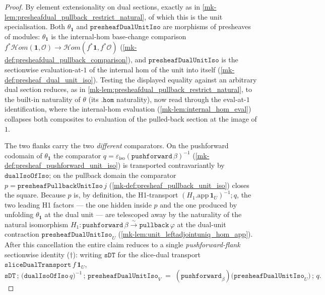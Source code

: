 \begin{proof}
  \leanok
  By element extensionality on dual sections, exactly as in
  \ref{mk-lem:presheafdual_pullback_restrict_natural}, of which this is the unit specialisation. Both
  \(\theta_{\mathbf 1}\) and \(\mathtt{presheafDualUnitIso}\) are morphisms of presheaves of modules:
  \(\theta_{\mathbf 1}\) is the internal-hom base-change comparison
  \(f^{*}\mathcal{H}om(\mathbf 1, \mathcal{O}) \to \mathcal{H}om(f^{*}\mathbf 1, f^{*}\mathcal{O})\)
  (\ref{mk-def:presheafdual_pullback_comparison}), and \(\mathtt{presheafDualUnitIso}\) is the
  sectionwise evaluation-at-\(1\) of the internal hom of the unit into itself
  (\ref{mk-def:presheaf_dual_unit_iso}). Testing the displayed equality against an arbitrary dual
  section reduces, as in \ref{mk-lem:presheafdual_pullback_restrict_natural}, to the built-in
  naturality of \(\theta\) (its \(\mathtt{.hom}\) naturality), now read through the eval-at-\(1\)
  identification, where the internal-hom evaluation (\ref{mk-lem:internal_hom_eval}) collapses both
  composites to evaluation of the pulled-back section at the image of \(1\).

  The two flanks carry the two \emph{different} comparators. On the pushforward codomain of
  \(\theta_{\mathbf 1}\) the comparator \(q = \varepsilon_{\mathrm{iso}}(\mathtt{pushforward}\,
  \beta)^{-1}\) (\ref{mk-def:presheaf_pushforward_unit_iso}) is transported contravariantly by
  \(\mathtt{dualIsoOfIso}\); on the pullback domain the comparator
  \(p = \mathtt{presheafPullbackUnitIso}\,j\) (\ref{mk-def:presheaf_pullback_unit_iso}) closes the
  square. Because \(p\) is, by definition, the H1-transport \((H_1.\mathrm{app}\,\mathbf 1_U)^{-1}
  \mathbin{;} q\), the two leading H1 factors --- the one hidden inside \(p\) and the one produced by
  unfolding \(\theta_{\mathbf 1}\) at the dual unit --- are telescoped away by the naturality of the
  natural isomorphism \(H_1 : \mathtt{pushforward}\,\beta \xrightarrow{\sim} \mathtt{pullback}\,
  \varphi\) at the dual-unit contraction \(\mathtt{presheafDualUnitIso}_U\)
  (\ref{mk-lem:unit_leftadjointuniq_hom_app}). After this cancellation the entire claim reduces to a
  single \emph{pushforward-flank} sectionwise identity ($\dagger$): writing \(\mathtt{sDT}\) for the
  slice-dual transport \(\mathtt{sliceDualTransport}\,f\,\mathbf 1_U\),
  \[
    \mathtt{sDT}
      \,\mathbin{;}\, \bigl(\mathtt{dualIsoOfIso}\,q\bigr)^{-1}
      \,\mathbin{;}\, \mathtt{presheafDualUnitIso}_V
    \;=\;
    (\mathtt{pushforward}_\beta)\bigl(\mathtt{presheafDualUnitIso}_U\bigr)
      \,\mathbin{;}\, q .
  \]


\end{proof}
